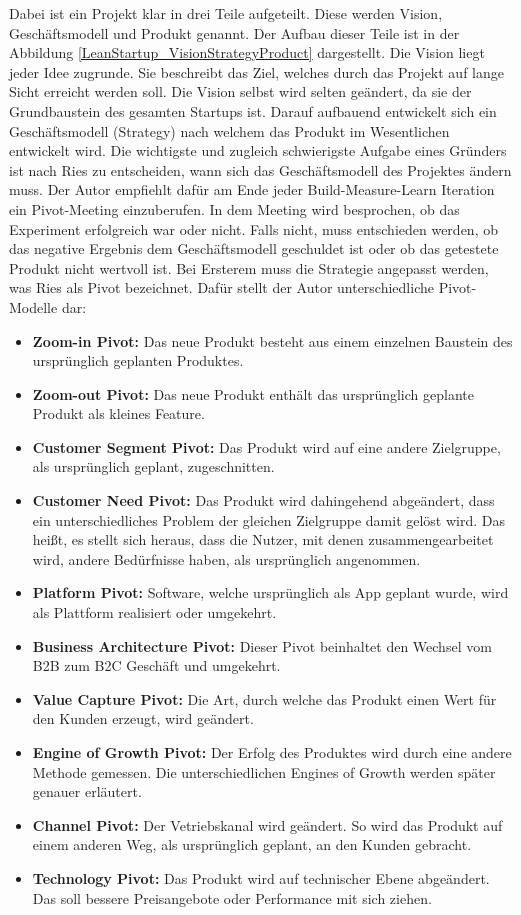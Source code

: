 Dabei ist ein Projekt klar in drei Teile aufgeteilt. Diese werden Vision, Geschäftsmodell und Produkt genannt. Der Aufbau dieser Teile ist in der Abbildung \ref{LeanStartup_VisionStrategyProduct} dargestellt. 
Die Vision liegt jeder Idee zugrunde. Sie beschreibt das Ziel, welches durch das Projekt auf lange Sicht erreicht werden soll. Die Vision selbst wird selten geändert, da sie der Grundbaustein des gesamten Startups ist. Darauf aufbauend entwickelt sich ein Geschäftsmodell (Strategy) nach welchem das Produkt im Wesentlichen entwickelt wird. Die wichtigste und zugleich schwierigste Aufgabe eines Gründers ist nach Ries zu entscheiden, wann sich das Geschäftsmodell des Projektes ändern muss. Der Autor empfiehlt dafür am Ende jeder Build-Measure-Learn Iteration ein Pivot-Meeting einzuberufen. In dem Meeting wird besprochen, ob das Experiment erfolgreich war oder nicht. Falls nicht, muss entschieden werden, ob das negative Ergebnis dem Geschäftsmodell geschuldet ist oder ob das getestete Produkt nicht wertvoll ist. Bei Ersterem muss die Strategie angepasst werden, was Ries als Pivot bezeichnet. Dafür stellt der Autor unterschiedliche Pivot-Modelle dar:
\begin{itemize}
	\item \textbf{Zoom-in Pivot:} Das neue Produkt besteht aus einem einzelnen Baustein des ursprünglich geplanten Produktes.
	\item \textbf{Zoom-out Pivot:} Das neue Produkt enthält das ursprünglich geplante Produkt als kleines Feature.
	\item \textbf{Customer Segment Pivot:} Das Produkt wird auf eine andere Zielgruppe, als ursprünglich geplant, zugeschnitten.
	\item \textbf{Customer Need Pivot:} Das Produkt wird dahingehend abgeändert, dass ein unterschiedliches Problem der gleichen Zielgruppe damit gelöst wird. Das heißt, es stellt sich heraus, dass die Nutzer, mit denen zusammengearbeitet wird, andere Bedürfnisse haben, als ursprünglich angenommen.
	\item \textbf{Platform Pivot:} Software, welche ursprünglich als App geplant wurde, wird als Plattform realisiert oder umgekehrt.
	\item \textbf{Business Architecture Pivot:} Dieser Pivot beinhaltet den Wechsel vom B2B zum B2C Geschäft und umgekehrt.
	\item \textbf{Value Capture Pivot:} Die Art, durch welche das Produkt einen Wert für den Kunden erzeugt, wird geändert. 
	\item \textbf{Engine of Growth Pivot:} Der Erfolg des Produktes wird durch eine andere Methode gemessen. Die unterschiedlichen Engines of Growth werden später genauer erläutert.
	\item \textbf{Channel Pivot:} Der Vetriebskanal wird geändert. So wird das Produkt auf einem anderen Weg, als ursprünglich geplant, an den Kunden gebracht.
	\item \textbf{Technology Pivot:} Das Produkt wird auf technischer Ebene abgeändert. Das soll bessere Preisangebote oder Performance mit sich ziehen.
\end{itemize}
